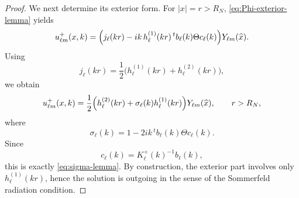 \documentclass[10pt,a4paper]{amsart}
\newcommand{\hj}[1]{h^{(1)}_{#1}}
\newcommand{\jj}[1]{j_{#1}}
\begin{document}
\begin{proof}
We next determine its exterior form. For $|x|=r>R_N$,
\eqref{eq:Phi-exterior-lemma} yields
\[
u_{\ell m}^+(x,k)
=
\Bigl(
\jj{\ell}(kr)
-
ik\,\hj{\ell}(kr)\,{}^t b_\ell(k)\Theta c_\ell(k)
\Bigr)Y_{\ell m}(\widehat x).
\]
Using
\[
\jj{\ell}(kr)=\frac12\bigl(\hj{\ell}(kr)+h_\ell^{(2)}(kr)\bigr),
\]
we obtain
\[
u_{\ell m}^+(x,k)
=
\frac12
\Bigl(
h_\ell^{(2)}(kr)+\sigma_\ell(k)\hj{\ell}(kr)
\Bigr)
Y_{\ell m}(\widehat x),
\qquad r>R_N,
\]
where
\[
\sigma_\ell(k)
=
1-2ik\,{}^t b_\ell(k)\Theta c_\ell(k).
\]
Since
\[
c_\ell(k)=K_\ell^+(k)^{-1}b_\ell(k),
\]
this is exactly \eqref{eq:sigma-lemma}.
By construction, the exterior part involves only $h_\ell^{(1)}(kr)$,
hence the solution is outgoing in the sense of the Sommerfeld
radiation condition.
\end{proof}
\end{document}
